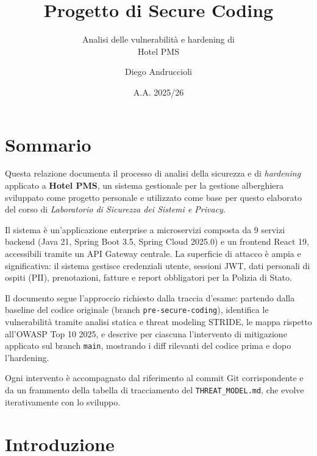 ﻿\documentclass[a4paper,12pt]{report}
\title{\textbf{Progetto di Secure Coding}}
\subtitle{Analisi delle vulnerabilità e hardening di \\ Hotel PMS}
\author{Diego Andruccioli}
\date{A.A. 2025/26}
\makeatletter
\gdef\@subtitle{}
\gdef\@subsubtitle{}
\renewcommand{\maketitle}{%
  \begin{titlepage}
    \centering
    \vspace*{3.5cm}
    {\LARGE\bfseries\@title}\par\bigskip
    \ifx\@subtitle\empty\else{\large\@subtitle}\par\medskip\fi
    \ifx\@subsubtitle\empty\else{\normalsize\@subsubtitle}\par\fi
    \vspace{2cm}
    {\large\@author\par}
    \vspace{0.5cm}
    {\normalsize\@date\par}
    \vfill
  \end{titlepage}
  \setcounter{page}{1}
}
\makeatother
\begin{document}
\maketitle

\chapter*{Sommario}

Questa relazione documenta il processo di analisi della sicurezza e di \textit{hardening} applicato
a \textbf{Hotel PMS}, un sistema gestionale per la gestione alberghiera sviluppato come progetto
personale e utilizzato come base per questo elaborato del corso di \textit{Laboratorio di Sicurezza dei Sistemi e Privacy}.

\par\medskip

Il sistema è un'applicazione enterprise a microservizi composta da 9 servizi backend (Java 21,
Spring Boot 3.5, Spring Cloud 2025.0) e un frontend React 19, accessibili tramite un API Gateway centrale.
La superficie di attacco è ampia e significativa: il sistema gestisce credenziali utente, sessioni
JWT, dati personali di ospiti (PII), prenotazioni, fatture e report obbligatori per la Polizia di Stato.

\par\medskip

Il documento segue l'approccio richiesto dalla traccia d'esame: partendo dalla baseline del codice
originale (branch \texttt{pre-secure-coding}), identifica le vulnerabilità tramite analisi statica e threat
modeling STRIDE, le mappa rispetto all'OWASP Top 10 2025, e descrive per ciascuna l'intervento
di mitigazione applicato sul branch \texttt{main}, mostrando i diff
rilevanti del codice prima e dopo l'hardening.

\par\medskip

Ogni intervento è accompagnato dal riferimento al commit Git corrispondente e da un frammento
della tabella di tracciamento del \texttt{THREAT\_MODEL.md}, che evolve iterativamente
con lo sviluppo.

\tableofcontents

\chapter{Introduzione}
\end{document}
